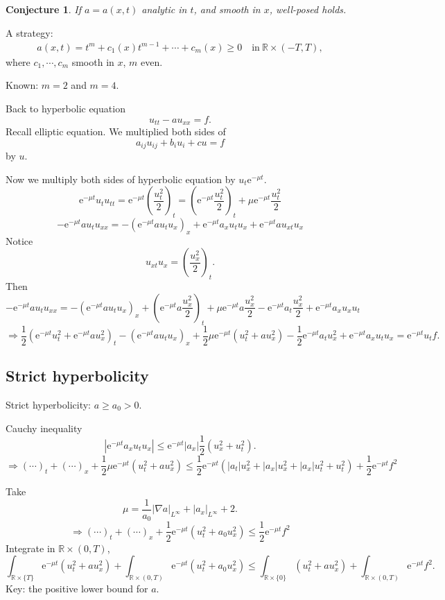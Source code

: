 \documentclass[12pt]{article}
\newtheorem{conjecture}{Conjecture}
\begin{document}
\begin{conjecture}
If $a=a(x,t) $ analytic in $t$, and smooth in $x$, well-posed holds.
\end{conjecture}
A strategy: 
\begin{align*}
a(x,t) =t^m+c_1(x)t^{m-1}+\cdots+c_m(x)\ge0\quad\mathrm{in\ }\mathbb{R}\times(-T,T),
\end{align*}
where $c_1,\cdots,c_m $ smooth in $x$, $m$ even.

Known: $m=2$ and $m=4$.

Back to hyperbolic equation
\[u_{tt}-au_{xx}=f. \]
Recall elliptic equation. We multiplied both sides of 
\[a_{ij}u_{ij}+b_iu_i+cu=f \]
by $u$.

Now we multiply both sides of hyperbolic equation by $u_t\mathrm{e}^{-\mu t} $.
\[\mathrm{e}^{-\mu t}u_tu_{tt}=\mathrm{e}^{-\mu t}\left(\frac{u_t^2}{2}\right)_t = \left(\mathrm{e}^{-\mu t}\frac{u_t^2}{2} \right)_t+\mu\mathrm{e}^{-\mu t}\frac{u_t^2}{2} \]
\[-\mathrm{e}^{-\mu t}au_tu_{xx}=-\left(\mathrm{e}^{-\mu t}au_tu_x \right)_x+\mathrm{e}^{-\mu t} a_xu_tu_x+\mathrm{e}^{-\mu t}au_{xt}u_x \]
Notice
\[u_{xt}u_x=\left(\frac{u_x^2}{2} \right)_t. \]
Then
\[-\mathrm{e}^{-\mu t}au_tu_{xx}=-\left(\mathrm{e}^{-\mu t}au_tu_x \right)_x+\left(\mathrm{e}^{-\mu t}a\frac{u_x^2}{2} \right)_t+\mu\mathrm{e}^{-\mu t}a\frac{u_x^2}{2}-\mathrm{e}^{-\mu t}a_t\frac{u_x^2}{2}+\mathrm{e}^{-\mu t}a_xu_xu_t \]
\[\Rightarrow \frac{1}{2}\left(\mathrm{e}^{-\mu t}u_t^2+\mathrm{e}^{-\mu t}au_x^2 \right)_t-\left(\mathrm{e}^{-\mu t}au_tu_x\right)_x+\frac{1}{2}\mu\mathrm{e}^{-\mu t} \left(u_t^2+au_x^2\right)-\frac{1}{2}\mathrm{e}^{-\mu t}a_tu_x^2+\mathrm{e}^{-\mu t}a_xu_tu_x=\mathrm{e}^{-\mu t}u_tf. \]

\subsection{Strict hyperbolicity}
Strict hyperbolicity: $a\ge a_0>0$.

Cauchy inequality
\[\left|\mathrm{e}^{-\mu t}a_xu_tu_x \right|\le\mathrm{e}^{-\mu t}|a_x|\frac{1}{2}\left(u_x^2+u_t^2\right). \]
\[\Rightarrow(\cdots)_t+(\cdots)_x+\frac{1}{2}\mu \mathrm{e}^{-\mu t} \left(u_t^2+au_x^2 \right)\le \frac{1}{2}\mathrm{e}^{-\mu t}\left(|a_t|u_x^2+|a_x|u_x^2+|a_x|u_t^2+u_t^2 \right)+\frac{1}{2}\mathrm{e}^{-\mu t}f^2 \]

Take
\[\mu = \frac{1}{a_0}|\nabla a|_{L^\infty}+|a_x|_{L^\infty}+2. \]
\[\Rightarrow (\cdots)_t+(\cdots)_x+\frac{1}{2}\mathrm{e}^{-\mu t}\left(u_t^2+a_0u_x^2 \right)\le \frac{1}{2}\mathrm{e}^{-\mu t}f^2 \]
Integrate in $\mathbb{R}\times(0,T)$,
\[\int_{\mathbb{R}\times\{T\}}\mathrm{e}^{-\mu t}\left(u_t^2+au_x^2 \right)+\int_{\mathbb{R}\times(0,T)}\mathrm{e}^{-\mu t}\left(u_t^2+a_0u_x^2 \right) \le \int_{\mathbb{R}\times\{0\}}\left(u_t^2+au_x^2 \right)+\int_{\mathbb{R}\times(0,T)}\mathrm{e}^{-\mu t}f^2. \]
Key: the positive lower bound for $a$.
\end{document}
